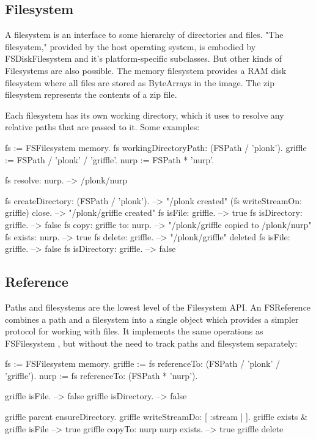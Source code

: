\documentclass[a4paper,10pt,twoside]{book}
\begin{document}
\subsection{Filesystem}

A filesystem is an interface to some hierarchy of directories and files. "The filesystem," provided by the host operating system, is embodied by FSDiskFilesystem and it's platform-specific subclasses. But other kinds of Filesystems are also possible. The memory filesystem provides a RAM disk filesystem where all files are stored as ByteArrays in the image. The zip filesystem represents the contents of a zip file.

Each filesystem has its own working directory, which it uses to resolve any relative paths that are passed to it. Some examples:

\begin{code}{}
    fs := FSFilesystem memory.
    fs workingDirectoryPath: (FSPath / 'plonk').
    griffle := FSPath / 'plonk' / 'griffle'.
    nurp := FSPath * 'nurp'.
    
    fs resolve: nurp.            --> /plonk/nurp
    
    fs createDirectory: (FSPath / 'plonk').  --> "/plonk created"
    (fs writeStreamOn: griffle) close.  --> "/plonk/griffle created"
    fs isFile: griffle.         --> true
    fs isDirectory: griffle.         --> false
    fs copy: griffle to: nurp.       --> "/plonk/griffle copied to /plonk/nurp"
    fs exists: nurp.             --> true
    fs delete: griffle.          --> "/plonk/griffle" deleted
    fs isFile: griffle.          --> false
    fs isDirectory: griffle.         --> false
\end{code}
	
\subsection{Reference}

Paths and filesystems are the lowest level of the Filesystem API. An FSReference combines a path and a filesystem into a single object which provides a simpler protocol for working with files. It implements the same operations as FSFilesystem , but without the need to track paths and filesystem separately:


\begin{code}{}
    fs := FSFilesystem memory.
    griffle := fs referenceTo: (FSPath / 'plonk' / 'griffle').
    nurp := fs referenceTo: (FSPath * 'nurp').
    
    griffle isFile.				--> false
    griffle isDirectory. 		--> false
    
    griffle parent ensureDirectory.
    griffle writeStreamDo: [ :stream | ].
    griffle exists & griffle isFile		--> true
    griffle copyTo: nurp
	nurp exists.				--> true
    griffle delete              
\end{code}    
\end{document}
